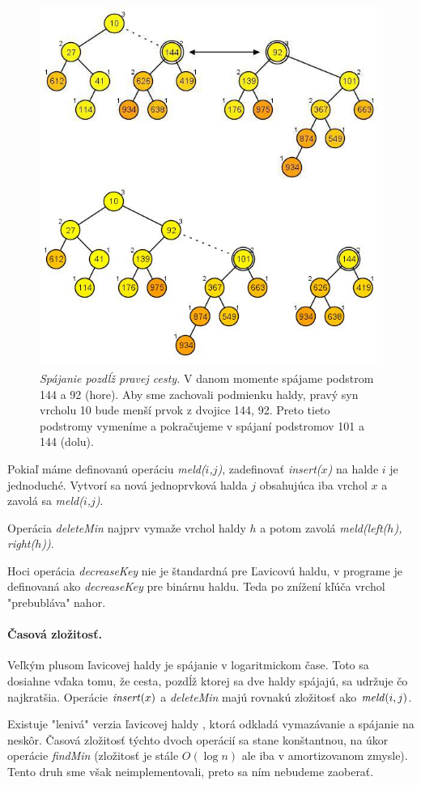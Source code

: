 \begin{figure}
\includegraphics[width=\columnwidth]{obrazky/leftistmeld.png}
\caption{\emph{Spájanie pozdĺž pravej cesty.} V danom momente spájame podstrom 144 a 92 (hore).
Aby sme zachovali podmienku haldy, pravý syn vrcholu 10 bude menší prvok z dvojice 144, 92.
Preto tieto podstromy vymeníme a pokračujeme v spájaní podstromov 101 a 144 (dolu).} 
\label{img:leftmeld} 
\end{figure}

Pokiaľ máme definovanú operáciu \emph{meld($i$,$j$)}, zadefinovať 
\emph{insert($x$)} na halde $i$ je jednoduché. Vytvorí sa nová jednoprvková 
halda $j$ obsahujúca iba vrchol $x$ a zavolá sa \emph{meld($i$,$j$)}.

Operácia \emph{deleteMin} najprv vymaže vrchol haldy $h$ a potom zavolá \emph{meld(left($h$), right($h$))}.

Hoci operácia \emph{decreaseKey} nie je štandardná pre Ľavicovú haldu, v programe je definovaná ako \emph{decreaseKey} pre 
binárnu haldu. Teda po znížení kľúča vrchol "prebubláva" nahor.

\paragraph{Časová zložitosť.}
Veľkým plusom ľavicovej haldy je spájanie v logaritmickom čase. 
Toto sa dosiahne vďaka tomu, že cesta, pozdĺž ktorej sa dve haldy spájajú, sa udržuje čo 
najkratšia. Operácie $\mathop{\mathit{insert}}(x)$ a \emph{deleteMin} majú rovnakú zložitosť ako $\mathop{\mathit{meld}}(i,j)$.

Existuje "lenivá" verzia ľavicovej haldy \citep{left}, ktorá odkladá vymazávanie a spájanie na neskôr.
Časová zložitosť týchto dvoch operácií sa stane konštantnou, na úkor operácie \emph{findMin} (zložitosť
je stále $O(\log n)$ ale iba v amortizovanom zmysle).
Tento druh sme však neimplementovali, preto sa ním nebudeme zaoberať.
